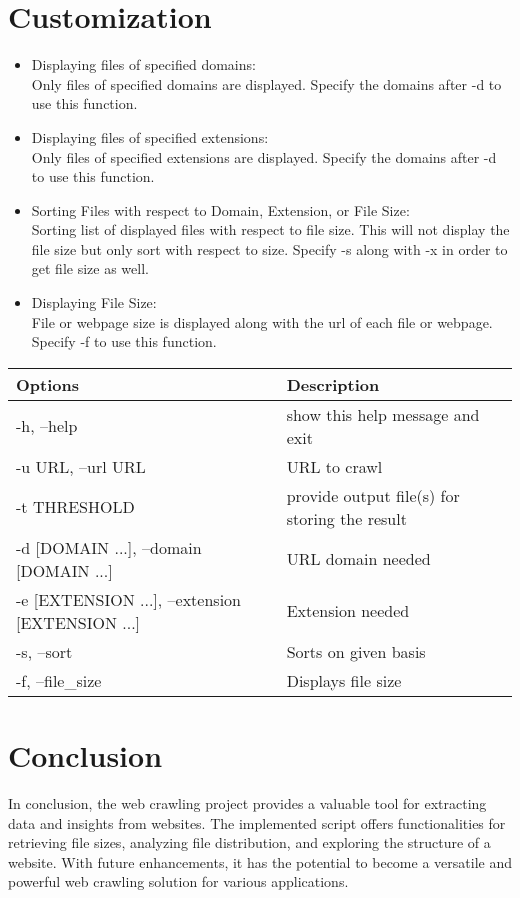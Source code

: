 \documentclass{article}
\begin{document}
\section{Customization}
\begin{itemize}
\item{Displaying files of specified domains: \\
Only files of specified domains are displayed. Specify the domains after -d to use this function. 
}
\item{Displaying files of specified extensions: \\
Only files of specified extensions are displayed. Specify the domains after -d to use this function. 
}
\item{Sorting Files with respect to Domain, Extension, or File Size: \\
Sorting list of displayed files with respect to file size. This will not display the file size but only sort with respect to size. Specify -s along with -x in order to get file size as well.
}
\item{Displaying File Size: \\
File or webpage size is displayed along with the url of each file or webpage. Specify -f to use this function.
}
\end{itemize}

\begin{tabular}{ | p{7 cm} | p{7 cm} | } 
\hline 
 \textbf{Options} & \textbf{Description} \\
 \hline
 \hline
 -h, --help & show this help message and exit \\
 \hline 
-u URL, --url URL & URL to crawl  \\
 \hline
 -t THRESHOLD & provide output file(s) for storing the result\\
 \hline
 -d [DOMAIN ...], --domain [DOMAIN ...] & URL domain needed\\
 \hline
 -e [EXTENSION ...], --extension [EXTENSION ...] & Extension needed\\
 \hline
 -s, --sort & Sorts on given basis\\
 \hline
 -f, --file\_size & Displays file size\\
 \hline
 
\end{tabular}

\section{Conclusion}
In conclusion, the web crawling project provides a valuable tool for extracting data and insights from websites. The implemented script offers functionalities for retrieving file sizes, analyzing file distribution, and exploring the structure of a website. With future enhancements, it has the potential to become a versatile and powerful web crawling solution for various applications.
\end{document}
